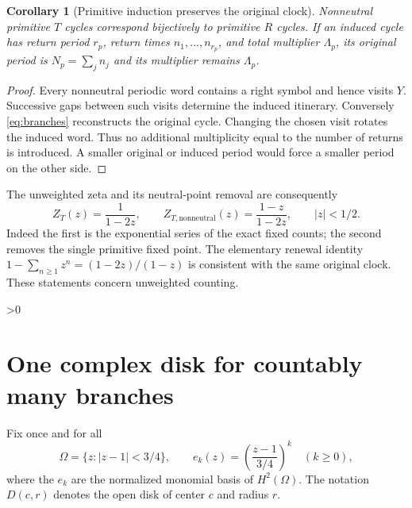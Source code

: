 \documentclass[10pt]{article}
\newtheorem{corollary}{Corollary}
\begin{document}
\begin{corollary}[Primitive induction preserves the original clock]
Nonneutral primitive $T$ cycles correspond bijectively to primitive $R$
cycles. If an induced cycle has return period $r_p$, return times
$n_1,\ldots,n_{r_p}$, and total multiplier $\Lambda_p$, its original period
is $N_p=\sum_j n_j$ and its multiplier remains $\Lambda_p$.
\end{corollary}
\begin{proof}
Every nonneutral periodic word contains a right symbol and hence visits $Y$.
Successive gaps between such visits determine the induced itinerary.
Conversely \eqref{eq:branches} reconstructs the original cycle. Changing the
chosen visit rotates the induced word. Thus no additional multiplicity equal
to the number of returns is introduced. A smaller original or induced
period would force a smaller period on the other side.
\end{proof}
The unweighted zeta and its neutral-point removal are consequently
\begin{equation}
Z_T(z)=\frac1{1-2z},\qquad
Z_{T,\mathrm{nonneutral}}(z)=\frac{1-z}{1-2z},\qquad |z|<1/2.
\label{eq:unweighted}
\end{equation}
Indeed the first is the exponential series of the exact fixed counts; the
second removes the single primitive fixed point. The elementary renewal
identity $1-\sum_{n\ge1}z^n=(1-2z)/(1-z)$ is consistent with the same
original clock. These statements concern unweighted counting.

\ifnum\CRevisionRound>0
\newpage
\section{One complex disk for countably many branches}
Fix once and for all
\begin{equation}
\Omega=\{z:|z-1|<3/4\},\qquad
e_k(z)=\left(\frac{z-1}{3/4}\right)^k\quad(k\ge0),
\label{eq:domain}
\end{equation}
where the $e_k$ are the normalized monomial basis of $H^2(\Omega)$.
The notation $D(c,r)$ denotes the open disk of center $c$ and radius $r$.
\end{document}
